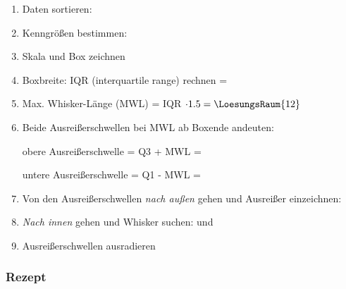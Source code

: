 \begin{enumerate}

\item Daten sortieren: 

\item Kenngrößen bestimmen: 
  \vspace{5mm}
  
\item Skala und Box zeichnen

\item Boxbreite: IQR (interquartile range) rechnen =
\item Max. Whisker-Länge (MWL) = IQR $\cdot{} 1.5 = \LoesungsRaum{12}$
  
\item Beide Ausreißerschwellen bei MWL ab Boxende andeuten:

  obere Ausreißerschwelle = Q3 + MWL = 

  untere Ausreißerschwelle = Q1 - MWL = 

  \item Von den Ausreißerschwellen \textit{nach außen} gehen und
    Ausreißer einzeichnen: 

  \item \textit{Nach innen} gehen und Whisker suchen:
     und 
    
  \item Ausreißerschwellen ausradieren
\end{enumerate}




\subsubsection{Rezept}



